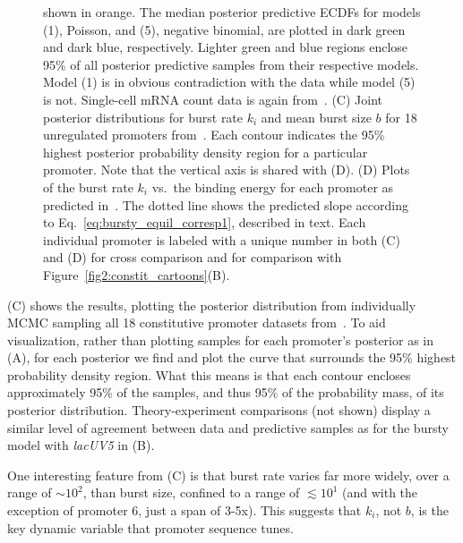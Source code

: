 \begin{figure}
{shown in orange. The median posterior predictive ECDFs for models (1), Poisson,
and (5), negative binomial, are plotted in dark green and dark blue,
respectively. Lighter green and blue regions enclose 95\% of all posterior
predictive samples from their respective models. Model (1) is in obvious
contradiction with the data while model (5) is not. Single-cell mRNA count data
is again from~\cite{Jones2014}. (C) Joint posterior distributions for burst rate
$k_i$ and mean burst size $b$ for 18 unregulated promoters
from~\cite{Jones2014}. Each contour indicates the 95\% highest posterior
probability density region for a particular promoter. Note that the vertical
axis is shared with (D). (D) Plots of the burst rate $k_i$ vs.\ the binding
energy for each promoter as predicted in~\cite{Brewster2012}. The dotted line
shows the predicted slope according to Eq.~\ref{eq:bursty_equil_corresp1},
described in text. Each individual promoter is labeled with a unique number in
both (C) and (D) for cross comparison and for comparison with 
Figure~\ref{fig2:constit_cartoons}(B).}
\label{fig:constit_post_full}
\end{figure}

(C) shows the results, plotting the posterior
distribution from individually MCMC sampling all 18 constitutive promoter
datasets from~\cite{Jones2014}. To aid visualization, rather than plotting
samples for each promoter's posterior as in (A), for
each posterior we find and plot the curve that surrounds the 95\% highest
probability density region. What this means is that each contour 
encloses approximately 95\% of the samples, and thus 95\% of the probability
mass, of its posterior distribution. Theory-experiment comparisons (not shown)
display a similar level of agreement between data and predictive samples as for
the bursty model with \textit{lacUV5} in (B).

One interesting feature from (C) is that burst rate
varies far more widely, over a range of $\sim10^2$, than burst size, confined to
a range of $\lesssim10^1$ (and with the exception of promoter 6, just a span of
3-5x). This suggests that $k_i$, not $b$, is the key dynamic variable that
promoter sequence tunes.

